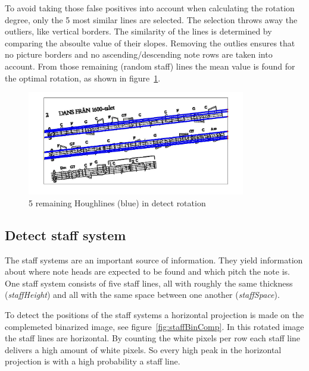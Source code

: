 To avoid taking those false positives into account when calculating the rotation degree, only the 5 most similar lines are selected. The selection throws away the outliers, like vertical borders. The similarity of the lines is determined by comparing the absoulte value of their slopes. Removing the outlies ensures that no picture borders and no ascending/descending note rows are taken into account. From those remaining (random staff) lines the mean value is found for the optimal rotation, as shown in figure~\ref{fig:rotfind}.


\begin{figure}[htbp]
    \centering
		\includegraphics[width=0.85\textwidth]{detectRot2.jpg}
		\caption[5 remaining Houghlines (blue) in detect rotation]{5 remaining Houghlines (blue) in detect rotation\label{fig:rotfind}}
\end{figure}
 
\subsection{Detect staff system}
The staff systems are an important source of information. They yield information about where note heads are expected to be found and which pitch the note is. One staff system consists of five staff lines, all with roughly the same thickness (\textit{staffHeight}) and all with the same space between one another (\textit{staffSpace}). \cite{DalitzDPF08}



To detect the positions of the staff systems a horizontal projection is made on the complemeted binarized image, see figure~\ref{fig:staffBinComp}. 
In this rotated image the staff lines are horizontal. By counting the white pixels per row each staff line delivers a high amount of white pixels. So every high peak in the horizontal projection is with a high probability a staff line.


